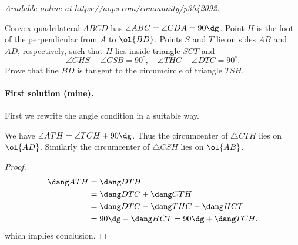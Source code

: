 \textsl{Available online at \url{https://aops.com/community/p3542092}.}
\begin{mdframed}[style=mdpurplebox,frametitle={Problem statement}]
Convex quadrilateral $ABCD$ has $\angle ABC = \angle CDA = 90\dg$.
Point $H$ is the foot of the perpendicular from $A$ to $\ol{BD}$.
Points $S$ and $T$ lie on sides $AB$ and $AD$,
respectively, such that $H$ lies inside triangle $SCT$ and
\[ \angle CHS - \angle CSB = 90^{\circ},
  \quad \angle THC - \angle DTC = 90^{\circ}. \]
Prove that line $BD$ is tangent to the circumcircle of triangle $TSH$.
\end{mdframed}
\paragraph{First solution (mine).}
First we rewrite the angle condition in a suitable way.
\begin{claim*}
  We have $\angle ATH = \angle TCH + 90\dg$.
  Thus the circumcenter of $\triangle CTH$ lies on $\ol{AD}$.
  Similarly the circumcenter of $\triangle CSH$ lies on $\ol{AB}$.
\end{claim*}
\begin{proof}
  \begin{align*}
    \dang ATH &= \dang DTH \\
    &= \dang DTC + \dang CTH \\
    &= \dang DTC - \dang THC - \dang HCT \\
    &= 90\dg - \dang HCT = 90\dg + \dang TCH.
  \end{align*}
  which implies conclusion.
\end{proof}

